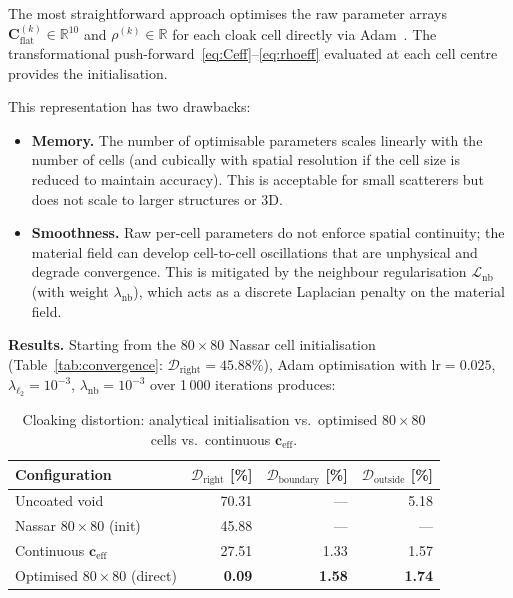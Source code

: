\documentclass{article}
\newcommand{\mbf}[1]{\mathbf{#1}}
\newcommand{\mcl}[1]{\mathcal{#1}}
\begin{document}
The most straightforward approach optimises the raw parameter arrays
$\mbf{C}_{\mathrm{flat}}^{(k)} \in \mathbb{R}^{10}$ and
$\rho^{(k)} \in \mathbb{R}$ for each cloak cell directly via
Adam~\cite{kingma2015adam}.
The transformational push-forward~\eqref{eq:Ceff}--\eqref{eq:rhoeff}
evaluated at each cell centre provides the initialisation.

This representation has two drawbacks:
\begin{itemize}
\item \textbf{Memory.}  The number of optimisable parameters scales
  linearly with the number of cells (and cubically with spatial
  resolution if the cell size is reduced to maintain accuracy).
  This is acceptable for small scatterers but does not scale to
  larger structures or 3D.
\item \textbf{Smoothness.}  Raw per-cell parameters do not enforce
  spatial continuity; the material field can develop
  cell-to-cell oscillations that are unphysical and degrade
  convergence.
  This is mitigated by the neighbour regularisation
  $\mcl{L}_{\mathrm{nb}}$ (with weight $\lambda_{\mathrm{nb}}$),
  which acts as a discrete Laplacian penalty on the material field.
\end{itemize}

\noindent
\textbf{Results.}
Starting from the $80\times80$ Nassar cell initialisation
(Table~\ref{tab:convergence}: $\mathcal{D}_{\mathrm{right}} = 45.88\%$),
Adam optimisation with $\mathrm{lr} = 0.025$,
$\lambda_{\ell_2} = 10^{-3}$, $\lambda_{\mathrm{nb}} = 10^{-3}$
over 1\,000 iterations produces:

\begin{table}[H]
\centering
\caption{Cloaking distortion: analytical initialisation vs.\ optimised
$80\times80$ cells vs.\ continuous $\mbf{c}_{\mathrm{eff}}$.}
\label{tab:opt_results}
\begin{tabular}{@{}lrrr@{}}
\toprule
Configuration
  & $\mathcal{D}_{\mathrm{right}}$ [\%]
  & $\mathcal{D}_{\mathrm{boundary}}$ [\%]
  & $\mathcal{D}_{\mathrm{outside}}$ [\%] \\
\midrule
Uncoated void           & 70.31 & --- & 5.18 \\
Nassar $80\times80$ (init) & 45.88 & --- & --- \\
Continuous $\mbf{c}_{\mathrm{eff}}$ & 27.51 & 1.33 & 1.57 \\
\midrule
Optimised $80\times80$ (direct) & \textbf{0.09} & \textbf{1.58} & \textbf{1.74} \\
\bottomrule
\end{tabular}
\end{table}
\end{document}
